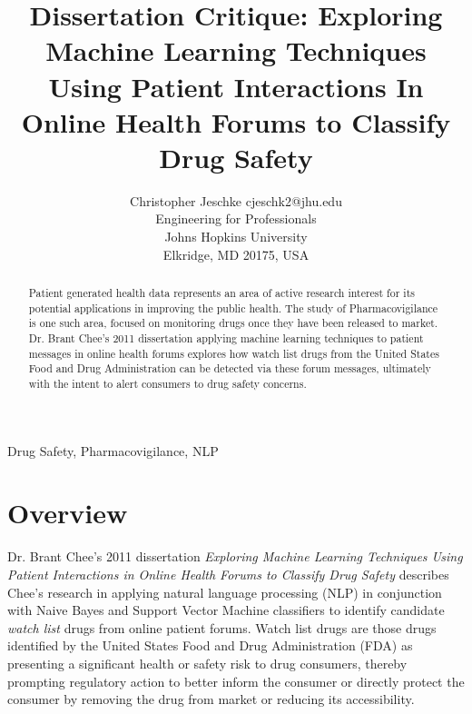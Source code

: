 \documentclass[twoside,11pt]{article}
\begin{document}
\title{Dissertation Critique: Exploring Machine Learning Techniques Using Patient
      Interactions In Online Health Forums to Classify Drug Safety}

\author{\name Christopher Jeschke \email cjeschk2@jhu.edu \\
       \addr Engineering for Professionals\\
       Johns Hopkins University\\
       Elkridge, MD 20175, USA}


\maketitle


\singlespacing

\begin{abstract}%
  Patient generated health data represents an area of active research interest
  for its potential applications in improving the public health. The study of
  Pharmacovigilance is one such area, focused on monitoring drugs once they have been
  released to market. Dr. Brant Chee's 2011 dissertation applying machine learning
  techniques to patient messages in online health forums explores how watch
  list drugs from the United States Food and Drug Administration can be detected
  via these forum messages, ultimately with the intent to alert consumers to drug
  safety concerns.
\end{abstract}

\begin{keywords}
  Drug Safety, Pharmacovigilance, NLP
\end{keywords}


\section{Overview}
Dr. Brant Chee's 2011 dissertation \textit{Exploring Machine Learning Techniques Using
Patient Interactions in Online Health Forums to Classify Drug Safety} describes
Chee's research in applying natural language processing (NLP) in conjunction
with Naive Bayes and Support Vector Machine classifiers to identify candidate
\textit{watch list} drugs from online patient forums. Watch list drugs are those
drugs identified by the United States Food and Drug Administration (FDA) as presenting
a significant health or safety risk to drug consumers, thereby prompting regulatory
action to better inform the consumer or directly protect the consumer
by removing the drug from market or reducing its accessibility.
\end{document}
